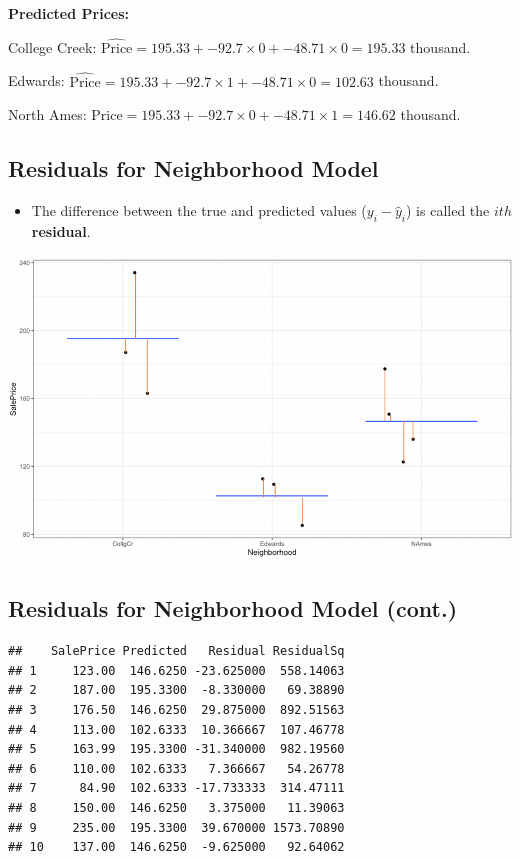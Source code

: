 \documentclass[]{book}
\providecommand{\tightlist}{%
  \setlength{\itemsep}{0pt}\setlength{\parskip}{0pt}}
\begin{document}
\textbf{Predicted Prices:}

College Creek:
\(\widehat{\text{Price}}= 195.33+ -92.7 \times0 +-48.71 \times0 = 195.33\)
thousand.

Edwards:
\(\widehat{\text{Price}}= 195.33+ -92.7 \times1 +-48.71 \times0 = 102.63\)
thousand.

North Ames:
\(\widehat{\text{Price}}= 195.33+ -92.7 \times0 +-48.71 \times1 = 146.62\)
thousand.

\subsection{Residuals for Neighborhood
Model}\label{residuals-for-neighborhood-model}

\begin{itemize}
\tightlist
\item
  The difference between the true and predicted values
  (\(y_i - \hat{y}_i\)) is called the \(ith\) \textbf{residual}.
\end{itemize}

\includegraphics[width=0.75\linewidth]{Cat_Resid}

\subsection{Residuals for Neighborhood Model
(cont.)}\label{residuals-for-neighborhood-model-cont.}

\begin{verbatim}
##    SalePrice Predicted   Residual ResidualSq
## 1     123.00  146.6250 -23.625000  558.14063
## 2     187.00  195.3300  -8.330000   69.38890
## 3     176.50  146.6250  29.875000  892.51563
## 4     113.00  102.6333  10.366667  107.46778
## 5     163.99  195.3300 -31.340000  982.19560
## 6     110.00  102.6333   7.366667   54.26778
## 7      84.90  102.6333 -17.733333  314.47111
## 8     150.00  146.6250   3.375000   11.39063
## 9     235.00  195.3300  39.670000 1573.70890
## 10    137.00  146.6250  -9.625000   92.64062
\end{verbatim}
\end{document}

